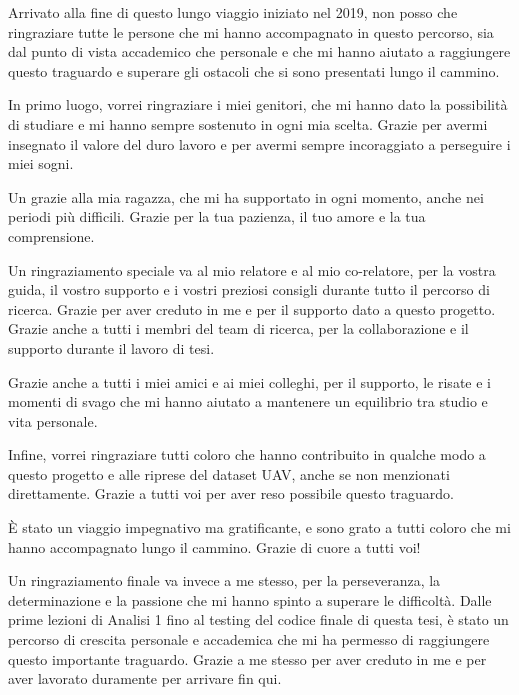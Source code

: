Arrivato alla fine di questo lungo viaggio iniziato nel 2019, non posso che ringraziare tutte le persone che mi hanno accompagnato in questo percorso, sia dal punto di vista accademico che personale e che mi hanno aiutato a 
raggiungere questo traguardo e superare gli ostacoli che si sono presentati lungo il cammino.

In primo luogo, vorrei ringraziare i miei genitori, che mi hanno dato la possibilità di studiare e mi hanno sempre sostenuto in ogni mia scelta. Grazie per avermi insegnato il valore del duro lavoro e per avermi sempre incoraggiato a 
perseguire i miei sogni.

Un grazie alla mia ragazza, che mi ha supportato in ogni momento, anche nei periodi più difficili. Grazie per la tua pazienza, il tuo amore e la tua comprensione.

Un ringraziamento speciale va al mio relatore e al mio co-relatore, per la vostra guida, il vostro supporto e i vostri preziosi consigli durante tutto il percorso di ricerca. Grazie per aver creduto in me e per il supporto dato a 
questo progetto. Grazie anche a tutti i membri del team di ricerca, per la collaborazione e il supporto durante il lavoro di tesi.

Grazie anche a tutti i miei amici e ai miei colleghi, per il supporto, le risate e i momenti di svago che mi hanno aiutato a mantenere un equilibrio tra studio e vita personale.

Infine, vorrei ringraziare tutti coloro che hanno contribuito in qualche modo a questo progetto e alle riprese del dataset UAV, anche se non menzionati direttamente. Grazie a tutti voi per aver reso possibile questo traguardo.

È stato un viaggio impegnativo ma gratificante, e sono grato a tutti coloro che mi hanno accompagnato lungo il cammino. Grazie di cuore a tutti voi!

Un ringraziamento finale va invece a me stesso, per la perseveranza, la determinazione e la passione che mi hanno spinto a superare le difficoltà. Dalle prime lezioni di Analisi 1 fino al testing del codice finale di questa tesi,
è stato un percorso di crescita personale e accademica che mi ha permesso di raggiungere questo importante traguardo. Grazie a me stesso per aver creduto in me e per aver lavorato duramente per arrivare fin qui.